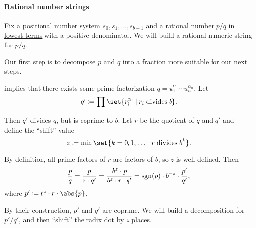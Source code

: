 \paragraph{Rational number strings}

\begin{algorithm}\label{alg:rational_number_to_positional_string}
  Fix a \hyperref[def:positional_number_system]{positional number system} \( s_0, s_1, \ldots, s_{b-1} \) and a rational number \( p / q \) \hyperref[def:lowest_terms]{in lowest terms} with a positive denominator. We will build a rational numeric string for \( p / q \).

  \begin{thmenum}
     Our first step is to decompose \( p \) and \( q \) into a fraction more suitable for our next steps.

     implies that there exists some prime factorization \( q = u_1^{\alpha_1} \cdots u_n^{\alpha_n} \). Let
    \begin{equation}\label{eq:alg:rational_number_to_positional_string/decomposition/q_}
      q' \coloneqq \prod \set{ r_i^{\alpha_i} \given r_i \T{divides} b }.
    \end{equation}

    Then \( q' \) divides \( q \), but is coprime to \( b \). Let \( r \) be the quotient of \( q \) and \( q' \) and define the \enquote{shift} value
    \begin{equation}\label{eq:alg:rational_number_to_positional_string/decomposition/shift}
      z \coloneqq \min\set{ k = 0, 1, \ldots \given r \T{divides} b^k }.
    \end{equation}

    By definition, all prime factors of \( r \) are factors of \( b \), so \( z \) is well-defined. Then
    \begin{equation}\label{eq:alg:rational_number_to_positional_string/decomposition/pq}
      \frac p q
      =
      \frac p {r \cdot q'}
      =
      \frac {b^z \cdot p} {b^z \cdot r \cdot q'}
      =
      \operatorname{sgn}(p) \cdot b^{-z} \cdot \frac {p'} {q'},
    \end{equation}
    where \( p' \coloneqq b^z \cdot r \cdot \abs{p} \).

    By their construction, \( p' \) and \( q' \) are coprime. We will build a decomposition for \( p' / q' \), and then \enquote{shift} the radix dot by \( z \) places.


\end{thmenum}
\end{algorithm}
